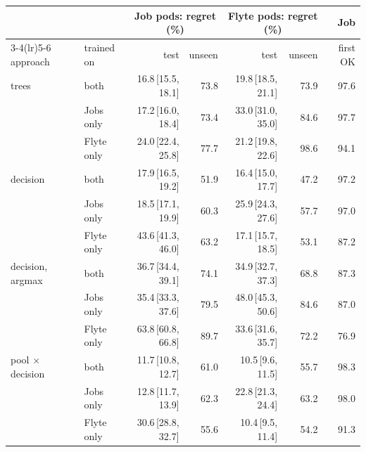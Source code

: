 \begin{tabular}{@{}llrrrrr@{}}
\toprule
&& \multicolumn{2}{c}{Job pods: regret (\%)} & \multicolumn{2}{c}{Flyte pods: regret (\%)} & Job \\
\cmidrule(lr){3-4}\cmidrule(lr){5-6}
approach & trained on & test & unseen & test & unseen & first OK \\
\midrule
trees & both & 16.8\,{\scriptsize[15.5, 18.1]} & 73.8 & 19.8\,{\scriptsize[18.5, 21.1]} & 73.9 & 97.6 \\
 & Jobs only & 17.2\,{\scriptsize[16.0, 18.4]} & 73.4 & 33.0\,{\scriptsize[31.0, 35.0]} & 84.6 & 97.7 \\
 & Flyte only & 24.0\,{\scriptsize[22.4, 25.8]} & 77.7 & 21.2\,{\scriptsize[19.8, 22.6]} & 98.6 & 94.1 \\
\midrule
decision & both & 17.9\,{\scriptsize[16.5, 19.2]} & 51.9 & 16.4\,{\scriptsize[15.0, 17.7]} & 47.2 & 97.2 \\
 & Jobs only & 18.5\,{\scriptsize[17.1, 19.9]} & 60.3 & 25.9\,{\scriptsize[24.3, 27.6]} & 57.7 & 97.0 \\
 & Flyte only & 43.6\,{\scriptsize[41.3, 46.0]} & 63.2 & 17.1\,{\scriptsize[15.7, 18.5]} & 53.1 & 87.2 \\
\midrule
decision, argmax & both & 36.7\,{\scriptsize[34.4, 39.1]} & 74.1 & 34.9\,{\scriptsize[32.7, 37.3]} & 68.8 & 87.3 \\
 & Jobs only & 35.4\,{\scriptsize[33.3, 37.6]} & 79.5 & 48.0\,{\scriptsize[45.3, 50.6]} & 84.6 & 87.0 \\
 & Flyte only & 63.8\,{\scriptsize[60.8, 66.8]} & 89.7 & 33.6\,{\scriptsize[31.6, 35.7]} & 72.2 & 76.9 \\
\midrule
pool $\times$ decision & both & 11.7\,{\scriptsize[10.8, 12.7]} & 61.0 & 10.5\,{\scriptsize[9.6, 11.5]} & 55.7 & 98.3 \\
 & Jobs only & 12.8\,{\scriptsize[11.7, 13.9]} & 62.3 & 22.8\,{\scriptsize[21.3, 24.4]} & 63.2 & 98.0 \\
 & Flyte only & 30.6\,{\scriptsize[28.8, 32.7]} & 55.6 & 10.4\,{\scriptsize[9.5, 11.4]} & 54.2 & 91.3 \\
\bottomrule
\end{tabular}
